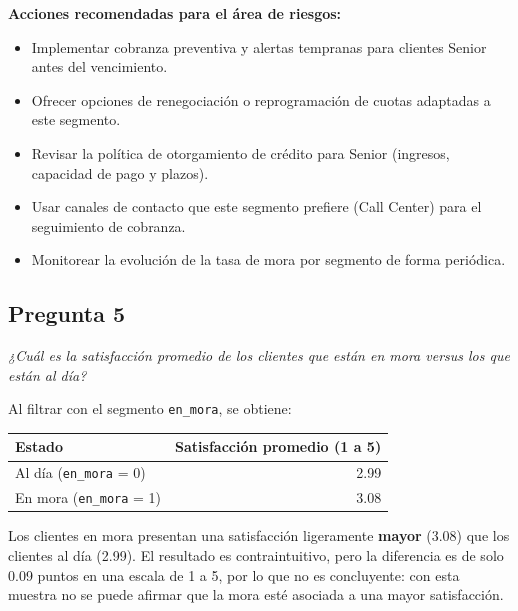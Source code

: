 \documentclass[11pt,a4paper]{article}
\newcommand{\pregunta}[2]{\subsection*{Pregunta #1}\textit{#2}}
\begin{document}
\textbf{Acciones recomendadas para el área de riesgos:}
\begin{itemize}[nosep]
  \item Implementar cobranza preventiva y alertas tempranas para clientes Senior antes del vencimiento.
  \item Ofrecer opciones de renegociación o reprogramación de cuotas adaptadas a este segmento.
  \item Revisar la política de otorgamiento de crédito para Senior (ingresos, capacidad de pago y plazos).
  \item Usar canales de contacto que este segmento prefiere (Call Center) para el seguimiento de cobranza.
  \item Monitorear la evolución de la tasa de mora por segmento de forma periódica.
\end{itemize}

\pregunta{5}{¿Cuál es la satisfacción promedio de los clientes que están en mora versus los que están al día?}

Al filtrar con el segmento \texttt{en\_mora}, se obtiene:

\begin{center}
\begin{tabular}{@{}lr@{}}
\toprule
Estado & Satisfacción promedio (1 a 5) \\
\midrule
Al día (\texttt{en\_mora} = 0) & 2.99 \\
En mora (\texttt{en\_mora} = 1) & 3.08 \\
\bottomrule
\end{tabular}
\end{center}

Los clientes en mora presentan una satisfacción ligeramente \textbf{mayor} (3.08) que los clientes al día (2.99). El resultado es contraintuitivo, pero la diferencia es de solo 0.09 puntos en una escala de 1 a 5, por lo que no es concluyente: con esta muestra no se puede afirmar que la mora esté asociada a una mayor satisfacción.
\end{document}
